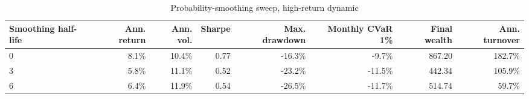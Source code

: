 ﻿\begin{table}[H]
\centering
\caption{Probability-smoothing sweep, high-return dynamic}
\label{tab:allocation-smoothing-high-return}
\small
\begin{adjustbox}{max width=\linewidth}
\begin{tabular}{lrrrrrrr}
\toprule
Smoothing half-life & Ann. return & Ann. vol. & Sharpe & Max. drawdown & Monthly CVaR 1\% & Final wealth & Ann. turnover \\
\midrule
0 & 8.1\% & 10.4\% & 0.77 & -16.3\% & -9.7\% & 867.20 & 182.7\% \\
3 & 5.8\% & 11.1\% & 0.52 & -23.2\% & -11.5\% & 442.34 & 105.9\% \\
6 & 6.4\% & 11.9\% & 0.54 & -26.5\% & -11.7\% & 514.74 & 59.7\% \\
\bottomrule
\end{tabular}
\end{adjustbox}
\end{table}


